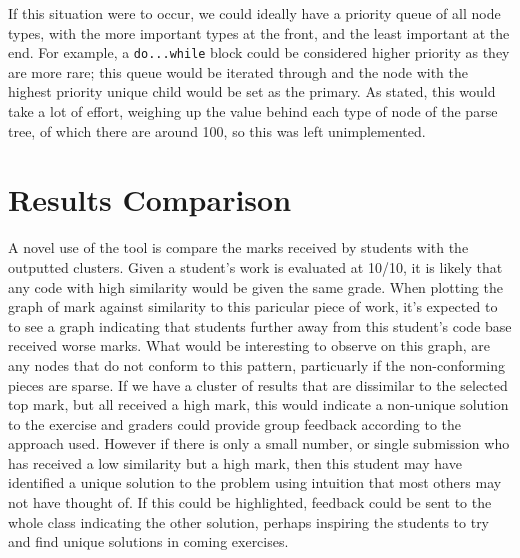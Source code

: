 If this situation were to occur, we could ideally have a priority queue of all
node types, with the more important types at the front, and the least important
at the end. For example, a \texttt{do...while} block could be considered higher
priority as they are more rare; this queue would be iterated through and the 
node with the highest priority unique child would be set as the primary. As stated,
this would take a lot of effort, weighing up the value behind each type of node
of the parse tree, of which there are around 100, so this was left unimplemented.


\section{Results Comparison}

A novel use of the tool is compare the marks received by students with the outputted clusters.
Given a student's work is evaluated at 10/10, it is likely that any
code with high similarity would be given the same grade. When plotting the graph
of mark against similarity to this paricular piece of work, it's expected to
to see a graph indicating that students further away from this student's code
base received worse marks. What would be interesting to observe on this graph,
are any nodes that do not conform to this pattern, particuarly if the non-conforming
pieces are sparse. If we have a cluster of results that are dissimilar to the
selected top mark, but all received a high mark, this would indicate a 
non-unique solution to the exercise and graders could provide group feedback
according to the approach used. However if there is only a small number, or single
submission who has received a low similarity but a high mark, then this student
may have identified a unique solution to the problem using intuition that most
others may not have thought of. If this could be highlighted, feedback could
be sent to the whole class indicating the other solution, perhaps inspiring the
students to try and find unique solutions in coming exercises.

